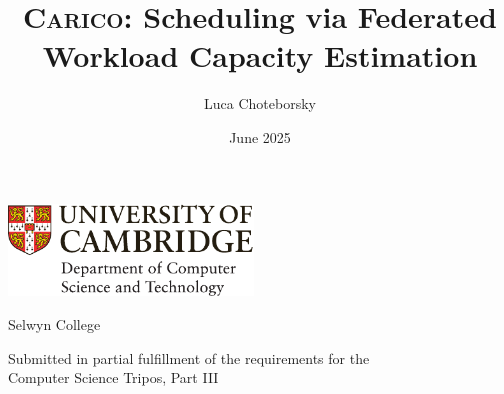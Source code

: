 \documentclass[12pt,a4paper,twoside]{report}
\title{\protect\textsc{Carico}: Scheduling via Federated Workload Capacity Estimation}
\author{Luca Choteborsky}
\date{June 2025}
\newif\ifsubmission %
\newcommand{\candidatenumber}{1234N}
\newcommand{\college}{Selwyn College}
\newcommand{\coursethe}{Computer Science Tripos, Part III}
\begin{document}
\begin{sffamily} %

\begin{titlepage}
\makeatletter

\hspace*{-14mm}\includegraphics[width=65mm]{logo-dcst-colour}

\ifsubmission

\begin{Large}
\vspace{20mm}
Research project report title page

\vspace{35mm}
Candidate \candidatenumber

\vspace{42mm}
\textsl{``\@title''}

\end{Large}

\else

\begin{center}
\Huge
\vspace{\fill}

\@title
\vspace{\fill}

\@author
\vspace{10mm}

\Large
\college
\vspace{\fill}

\@date
\vspace{\fill}

\end{center}

\fi

\vspace{\fill}
\begin{center}
Submitted in partial fulfillment of the requirements for the\\
\coursethe
\end{center}

\makeatother
\end{titlepage}

\newpage


\end{sffamily}
\end{document}
